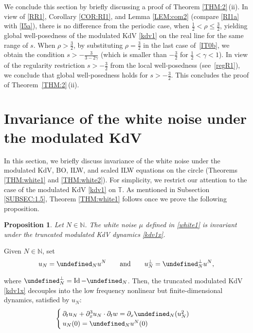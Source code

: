 \documentclass[letterpaper, 11pt,  reqno]{amsart}
\newtheorem{proposition}[theorem]{Proposition}
\DeclareMathOperator{\Id}{Id}
\newcommand{\1}{\hspace{0.5mm}\text{I}\hspace{0.5mm}}
\newcommand{\noi}{\noindent}
\newcommand{\T}{\mathbb{T}}
\let\P= \undefined
\newcommand{\P}{\mathbf{P}}
\newcommand{\g}{\gamma}
\newcommand{\dx}{\partial_x}
\newcommand{\dt}{\partial_t}
\newcommand{\N}{\mathbb{N}}
\numberwithin{equation}{section}
\numberwithin{theorem}{section}
\begin{document}
We conclude this section by briefly discussing a proof of Theorem 
\ref{THM:2}\,(ii).
In view of 
\eqref{RR1}, Corollary \ref{COR:RI1}, 
and Lemma \ref{LEM:com2}
(compare \eqref{RI1a} with \eqref{I5a}), 
there is no difference from the periodic case, when $\frac 12< \rho \le \frac 32$, 
yielding 
global well-posedness of the modulated KdV \eqref{kdv1} on the real line
for the same range of $s$.
When $\rho > \frac 32$, 
by substituting $\rho = \frac 32$ in the last case of~\eqref{IT0b}, 
we obtain the condition $s > - \frac 3{3- 2\g}$ (which is smaller than $-\frac 32$ for $\frac 12 < \g < 1$).
In view of the regularity restriction $s > - \frac 32$
from the local well-posedness (see~\eqref{regR1}), 
we conclude that global well-posedness
holds for  $s > - \frac  32$.
This concludes the proof of Theorem~\ref{THM:2}\,(ii).










\section{Invariance of the white noise under the modulated KdV}
\label{SEC:WN}



In this section, we briefly discuss 
invariance of the white noise under
the modulated KdV, BO, ILW, and scaled ILW equations on the circle
(Theorems \ref{THM:white1} and \ref{THM:white2}).
For simplicity, we restrict our attention to the case
of the modulated KdV \eqref{kdv1} on $\T$.
As mentioned in Subsection \ref{SUBSEC:1.5}, 
Theorem \ref{THM:white1} follows once we prove the following proposition.


\begin{proposition}\label{PROP:white2}
Let $N \in \N$. The white noise $\mu$ defined in \eqref{white1}
is invariant under
the truncated modulated KdV dynamics \eqref{kdv1x}.
\end{proposition}





Given $N \in \N$, 
set
\begin{align*}
u_N = \P_N u^N\qquad \text{and}\qquad
u_N^\perp = \P_N^\perp u^N, 
\end{align*}

\noi
where  $\P_N^\perp = \Id - \P_N$.
Then, the truncated modulated KdV \eqref{kdv1x}
decouples into the low frequency nonlinear but finite-dimensional dynamics, 
satisfied by $u_N$:
\begin{equation}
\begin{cases}
\dt u_N+  \dx^3 u_N \cdot \dt w =\dx \P_N(u_N^2) \\
u_N(0) = \P_N u^N(0)
\end{cases}
\label{kdv1x2}
\end{equation}
\end{document}
